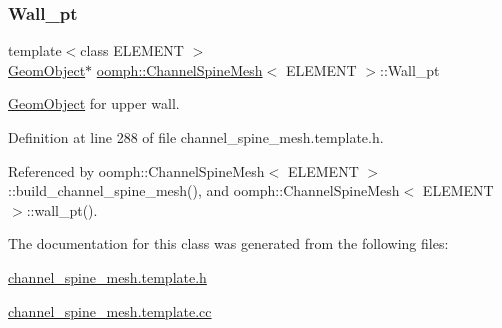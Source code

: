 \subsubsection{\texorpdfstring{Wall\+\_\+pt}{Wall\_pt}}
{\footnotesize\ttfamily template$<$class E\+L\+E\+M\+E\+NT $>$ \\
\hyperlink{classoomph_1_1GeomObject}{Geom\+Object}$\ast$ \hyperlink{classoomph_1_1ChannelSpineMesh}{oomph\+::\+Channel\+Spine\+Mesh}$<$ E\+L\+E\+M\+E\+NT $>$\+::Wall\+\_\+pt\hspace{0.3cm}{\ttfamily [protected]}}



\hyperlink{classoomph_1_1GeomObject}{Geom\+Object} for upper wall. 



Definition at line 288 of file channel\+\_\+spine\+\_\+mesh.\+template.\+h.



Referenced by oomph\+::\+Channel\+Spine\+Mesh$<$ E\+L\+E\+M\+E\+N\+T $>$\+::build\+\_\+channel\+\_\+spine\+\_\+mesh(), and oomph\+::\+Channel\+Spine\+Mesh$<$ E\+L\+E\+M\+E\+N\+T $>$\+::wall\+\_\+pt().



The documentation for this class was generated from the following files\+:\begin{DoxyCompactItemize}
\item 
\hyperlink{channel__spine__mesh_8template_8h}{channel\+\_\+spine\+\_\+mesh.\+template.\+h}\item 
\hyperlink{channel__spine__mesh_8template_8cc}{channel\+\_\+spine\+\_\+mesh.\+template.\+cc}\end{DoxyCompactItemize}
